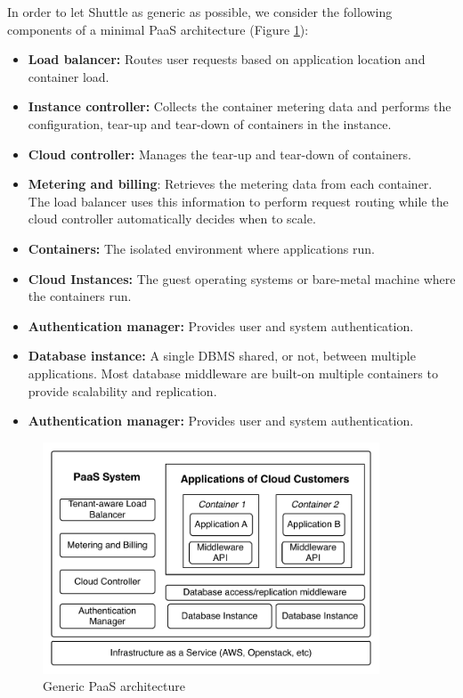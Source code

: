 In order to let Shuttle as generic as possible, we consider the following components of a minimal \ac{PaaS} architecture (Figure \ref{fig:paasArchitecture}):
\begin{itemize}
\item \textbf{Load balancer:} Routes user requests based on application location and container load.
\item \textbf{Instance controller:} Collects the container metering data and performs the configuration, tear-up and tear-down of containers in the instance.
\item \textbf{Cloud controller:} Manages the tear-up and tear-down of containers.
\item \textbf{Metering and billing}: Retrieves the metering data from each container. The load balancer uses this information to perform request routing while the cloud controller automatically decides when to scale.
\item \textbf{Containers:} The isolated environment where applications run.
\item \textbf{Cloud Instances:} The guest operating systems or bare-metal machine where the containers run.
\item \textbf{Authentication manager:} Provides user and system authentication.
\item \textbf{Database instance:} A single \ac{DBMS} shared, or not, between multiple applications. Most database middleware are built-on multiple containers to provide scalability and replication.
\item \textbf{Authentication manager:} Provides user and system authentication.
\end{itemize}

\begin{figure}
\centering
\includegraphics[width=100mm]{images/paas}
\caption{Generic \ac{PaaS} architecture}
\label{fig:paasArchitecture}
\end{figure}

